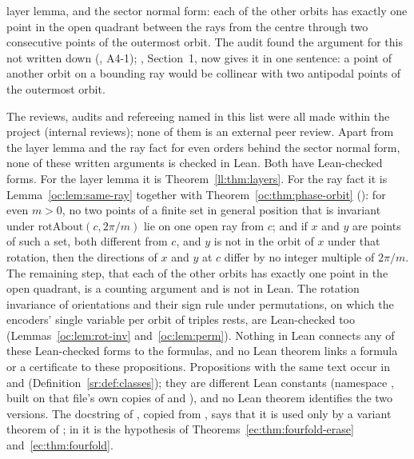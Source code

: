 \begin{remark}
\begin{itemize}
  layer lemma, and the sector normal form: each of the other orbits has exactly one
  point in the open quadrant between the rays from the centre through two consecutive points of the outermost orbit.
  The audit found the argument for this not written down (, A4-1); , Section~1,
  now gives it in one sentence: a point of another orbit on a bounding ray would be collinear with two antipodal
  points of the outermost orbit.
\end{itemize}
The reviews, audits and refereeing named in this list were all made within the project (internal reviews); none of
them is an external peer review. Apart from the layer lemma and the ray fact for even orders behind the sector
normal form, none of these written arguments is checked in Lean. Both have Lean-checked forms. For the layer lemma
it is Theorem~\ref{ll:thm:layers}.
For the ray fact it is Lemma~\ref{oc:lem:same-ray} together with Theorem~\ref{oc:thm:phase-orbit}
(): for even $m>0$, no two points of a finite set in general position that
is invariant under $\mathrm{rotAbout}(c,2\pi/m)$ lie on one open ray from $c$; and if $x$ and $y$ are points of such a
set, both different from $c$, and $y$ is not in the orbit of $x$ under that rotation, then the directions of $x$ and
$y$ at $c$ differ by no integer multiple of $2\pi/m$. The
remaining step, that each of the other orbits has exactly one point in the open quadrant, is a counting argument and
is not in Lean. The rotation invariance of orientations and their sign rule under permutations, on which the
encoders' single variable per orbit of triples rests, are Lean-checked too (Lemmas~\ref{oc:lem:rot-inv}
and~\ref{oc:lem:perm}). Nothing in Lean connects any of these Lean-checked forms to the formulas, and no Lean theorem
links a formula or a certificate to these propositions. Propositions with the same text occur in
 and 
(Definition~\ref{sr:def:classes}); they are different Lean constants (namespace ,
built on that file's own copies of  and ), and no Lean theorem identifies the two
versions. The docstring of , copied from , says that it is used only by a variant
theorem of ; in  it is the hypothesis of
Theorems~\ref{ec:thm:fourfold-erase} and~\ref{ec:thm:fourfold}.
\end{remark}

